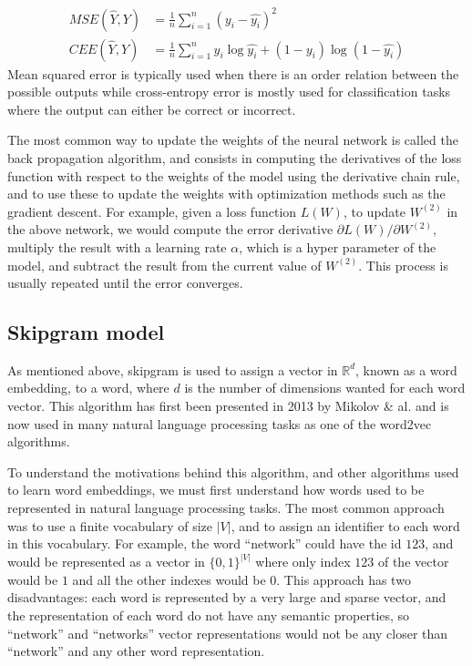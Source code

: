 \begin{align}
  \label{eq:mse}MSE(\hat{Y}, Y) &= \frac{1}{n}\sum_{i=1}^{n} \left( y_i - \hat{y_i} \right)^2\\
  \label{eq:cee}CEE(\hat{Y}, Y) &= \frac{1}{n}\sum_{i=1}^{n}
                                  y_i\log\hat{y_i} + (1 - y_i)\log(1 - \hat{y_i})
\end{align}
Mean squared error is typically used when there is an order relation between the
possible outputs while cross-entropy error is mostly used for classification
tasks where the output can either be correct or incorrect.

The most common way to update the weights of the neural network is called the
back propagation algorithm, and consists in computing the derivatives of the
loss function with respect to the weights of the model using the derivative
chain rule, and to use these to update the weights with optimization methods
such as the gradient descent. For example, given a loss function $L(W)$, to
update $W^{(2)}$ in the above network, we would compute the error derivative
$\partial L(W)/\partial W^{(2)}$, multiply the result with a learning
rate $\alpha$, which is a hyper parameter of the model, and subtract the result
from the current value of $W^{(2)}$. This process is usually repeated until the
error converges.
\subsection{Skipgram model}
As mentioned above, skipgram is used to assign a vector in $\mathbb{R}^d$, known
as a word embedding, to a word, where $d$ is the number of dimensions wanted for
each word vector. This algorithm has first been presented in 2013 by Mikolov \&
al. \cite{DBLP:journals/corr/MikolovSCCD13} and is now used in many natural
language processing tasks as one of the word2vec algorithms.

To understand the motivations behind this algorithm, and other algorithms used
to learn word embeddings, we must first understand how words used to be
represented in natural language processing tasks. The most common approach was
to use a finite vocabulary of size $|V|$, and to assign an identifier to each
word in this vocabulary. For example, the word ``network'' could have the id
$123$, and would be represented as a vector in $\{0,1\}^{|V|}$ where only index
$123$ of the vector would be $1$ and all the other indexes would be $0$. This
approach has two disadvantages: each word is represented by a very large and
sparse vector, and the representation of each word do not have any semantic
properties, so ``network'' and ``networks'' vector representations would not be
any closer than ``network'' and any other word representation.

